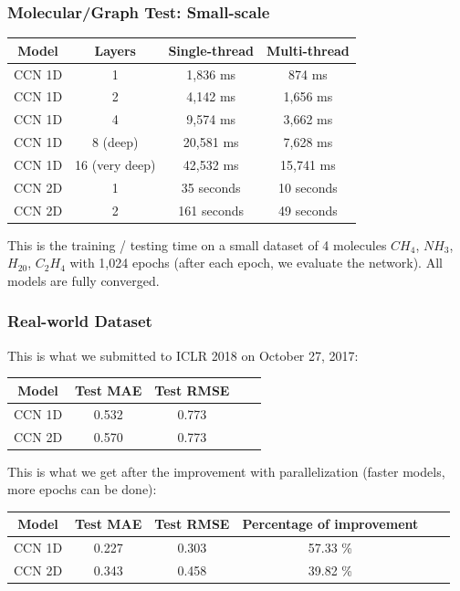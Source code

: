 \documentclass{beamer}
\begin{document}
\begin{frame}
\frametitle{Molecular/Graph Test: Small-scale}
\begin{center}
\begin{tabular}{|| c | c | c | c ||}	
	\hline
	Model & Layers & Single-thread & Multi-thread \\
	\hline\hline
	CCN 1D & 1 & 1,836 ms & 874 ms \\
	\hline
	CCN 1D & 2 & 4,142 ms & 1,656 ms\\
	\hline
	CCN 1D & 4 & 9,574 ms & 3,662 ms \\
	\hline
	CCN 1D & 8 (deep) & 20,581 ms & 7,628 ms \\
	\hline
	CCN 1D & 16 (very deep) & 42,532 ms & 15,741 ms\\
	\hline
	CCN 2D & 1 & 35 seconds & 10 seconds \\
	\hline
	CCN 2D & 2 & 161 seconds & 49 seconds \\
	\hline
\end{tabular}
\end{center}
This is the training / testing time on a small dataset of 4 molecules $CH_4$, $NH_3$, $H_20$, $C_2H_4$ with 1,024 epochs (after each epoch, we evaluate the network). All models are fully converged.
\end{frame}

\begin{frame}
\frametitle{Real-world Dataset}
This is what we submitted to ICLR 2018 on October 27, 2017:
\begin{center}
\begin{tabular}{||c | c | c | c | c ||}
	\hline
	Model & Test MAE & Test RMSE \\ 
	\hline
	CCN 1D & 0.532 & 0.773 \\
	\hline
	CCN 2D & 0.570 & 0.773 \\
	\hline
\end{tabular}
\end{center}
This is what we get after the improvement with parallelization (faster models, more epochs can be done):
\begin{center}
\begin{tabular}{||c | c | c | c | c | c ||}
	\hline
	Model & Test MAE & Test RMSE & Percentage of improvement\\ 
	\hline
	CCN 1D & 0.227 & 0.303 & 57.33 \% \\
	\hline
	CCN 2D & 0.343 & 0.458 & 39.82 \% \\
	\hline
\end{tabular}
\end{center}
\end{frame}
\end{document}
